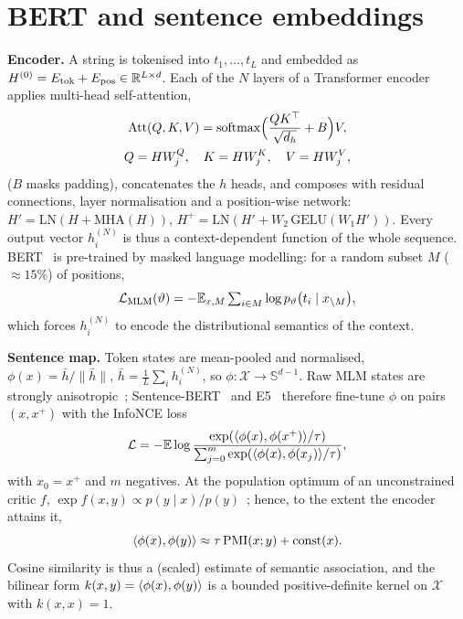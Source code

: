 \documentclass[10pt,twocolumn]{article}
\newcommand{\Sph}{\mathbb{S}^{d-1}}
\begin{document}
\section{BERT and sentence embeddings}
\textbf{Encoder.} A string is tokenised into $t_1,\dots,t_L$ and embedded as $H^{(0)}=E_{\mathrm{tok}}+E_{\mathrm{pos}}\in\mathbb{R}^{L\times d}$. Each of the $N$ layers of a Transformer encoder~\cite{vaswani2017} applies multi-head self-attention,
\begin{gather}
\mathrm{Att}(Q,K,V)=\operatorname{softmax}\!\Big(\frac{QK^\top}{\sqrt{d_h}}+B\Big)V,\\
Q=HW^Q_j,\quad K=HW^K_j,\quad V=HW^V_j,\notag
\end{gather}
($B$ masks padding), concatenates the $h$ heads, and composes with residual connections, layer normalisation and a position-wise network: $H'=\mathrm{LN}(H+\mathrm{MHA}(H))$, $H^{+}=\mathrm{LN}(H'+W_2\,\mathrm{GELU}(W_1H'))$. Every output vector $h_i^{(N)}$ is thus a context-dependent function of the whole sequence. BERT~\cite{devlin2019} is pre-trained by masked language modelling: for a random subset $M$ ($\approx15\%$) of positions,
\begin{equation}
\mathcal L_{\mathrm{MLM}}(\vartheta)=-\mathbb{E}_{x,M}\textstyle\sum_{i\in M}\log p_\vartheta\big(t_i\mid x_{\setminus M}\big),
\end{equation}
which forces $h_i^{(N)}$ to encode the distributional semantics of the context.

\textbf{Sentence map.} Token states are mean-pooled and normalised,
$\phi(x)=\bar h/\|\bar h\|$, $\bar h=\frac1L\sum_i h_i^{(N)}$, so $\phi:\mathcal X\to\Sph$. Raw MLM states are strongly anisotropic~\cite{ethayarajh2019}; Sentence-BERT~\cite{reimers2019,reimers2020} and E5~\cite{wang2022e5} therefore fine-tune $\phi$ on pairs $(x,x^+)$ with the InfoNCE loss~\cite{oord2018}
\begin{equation}
\mathcal L=-\mathbb{E}\log\frac{\exp(\langle \phi(x),\phi(x^+)\rangle/\tau)}{\sum_{j=0}^{m}\exp(\langle \phi(x),\phi(x_j)\rangle/\tau)},
\end{equation}
with $x_0=x^+$ and $m$ negatives. At the population optimum of an unconstrained critic $f$, $\exp f(x,y)\propto p(y\mid x)/p(y)$~\cite{oord2018}; hence, to the extent the encoder attains it,
\begin{equation}\label{eq:pmi}
\langle \phi(x),\phi(y)\rangle\approx\tau\,\mathrm{PMI}(x;y)+\mathrm{const}(x).
\end{equation}
Cosine similarity is thus a (scaled) estimate of semantic association, and the bilinear form $k(x,y)=\langle \phi(x),\phi(y)\rangle$ is a bounded positive-definite kernel on $\mathcal X$ with $k(x,x)=1$.
\end{document}
